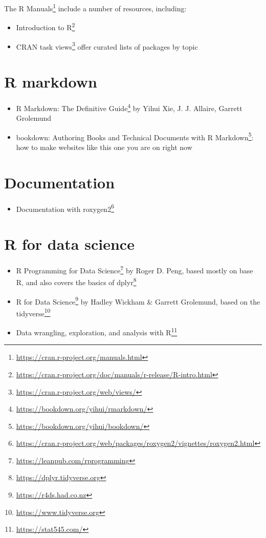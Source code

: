 \documentclass[
]{book}
\providecommand{\tightlist}{%
  \setlength{\itemsep}{0pt}\setlength{\parskip}{0pt}}
\renewcommand{\href}[2]{#2\footnote{\url{#1}}}
\begin{document}
\href{https://cran.r-project.org/manuals.html}{The R Manuals} include a number of resources, including:

\begin{itemize}
\tightlist
\item
  \href{https://cran.r-project.org/doc/manuals/r-release/R-intro.html}{Introduction to R}
\item
  \href{https://cran.r-project.org/web/views/}{CRAN task views} offer curated lists of packages by topic
\end{itemize}

\hypertarget{r-markdown}{%
\section{R markdown}\label{r-markdown}}

\begin{itemize}
\tightlist
\item
  \href{https://bookdown.org/yihui/rmarkdown/}{R Markdown: The Definitive Guide} by Yihui Xie, J. J. Allaire, Garrett Grolemund
\item
  \href{https://bookdown.org/yihui/bookdown/}{bookdown: Authoring Books and Technical Documents with R Markdown}: how to make websites like this one you are on right now
\end{itemize}

\hypertarget{documentation}{%
\section{Documentation}\label{documentation}}

\begin{itemize}
\tightlist
\item
  \href{https://cran.r-project.org/web/packages/roxygen2/vignettes/roxygen2.html}{Documentation with roxygen2}
\end{itemize}

\hypertarget{r-for-data-science}{%
\section{R for data science}\label{r-for-data-science}}

\begin{itemize}
\tightlist
\item
  \href{https://leanpub.com/rprogramming}{R Programming for Data Science} by Roger D. Peng, based mostly on base R, and also covers the basics of \href{https://dplyr.tidyverse.org}{dplyr}
\item
  \href{https://r4ds.had.co.nz}{R for Data Science} by Hadley Wickham \& Garrett Grolemund, based on the \href{https://www.tidyverse.org}{tidyverse}
\item
  \href{https://stat545.com/}{Data wrangling, exploration, and analysis with R}
\end{itemize}
\end{document}
